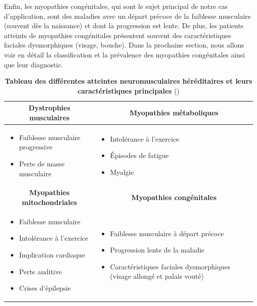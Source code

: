 Enfin, les myopathies congénitales, qui sont le sujet principal de notre cas d'application, sont des maladies avec un départ précoce de la faiblesse musculaire (souvent dès la naissance) et dont la progression est lente. De plus, les patients atteints de myopathies congénitales présentent souvent des caractéristiques faciales dysmorphiques (visage, bouche). Dans la prochaine section, nous allons voir en détail la classification et la prévalence des myopathies congénitales ainsi que leur diagnostic.
\begin{table}[!ht]
\centering
\begin{tabularx}{\textwidth}{|X|X|}
 \hline
\multicolumn{1}{|c|}{\textbf{Dystrophies musculaires}} & \multicolumn{1}{|c|}{\textbf{Myopathies métaboliques}} \\
\hline
\begin{itemize}
\item Faiblesse musculaire progressive
\item Perte de masse musculaire
\end{itemize} &
\begin{itemize}
\item Intolérance à l'exercice
\item Épisodes de fatigue
\item Myalgie
\end{itemize} \\
\hline

\multicolumn{1}{|c|}{\textbf{Myopathies mitochondriales}} & \multicolumn{1}{|c|}{\textbf{Myopathies congénitales}} \\
\hline
\begin{itemize}
\item Faiblesse musculaire
\item Intolérance à l'exercice
\item Implication cardiaque
\item Perte auditive
\item Crises d'épilepsie
\end{itemize} &
\begin{itemize}
\item Faiblesse musculaire à départ précoce
\item Progression lente de la maladie
\item Caractéristiques faciales dysmorphiques (visage allongé et palais vouté)
\end{itemize} \\
\hline
\end{tabularx}

\caption[Tableau des différentes atteintes neuromusculaires et leurs caractéristiques principales]{\textbf{Tableau des différentes atteintes neuromusculaires héréditaires et leurs caractéristiques principales} (\cite{lornage_identification_2019})}
\label{table:nmd}
\end{table}

